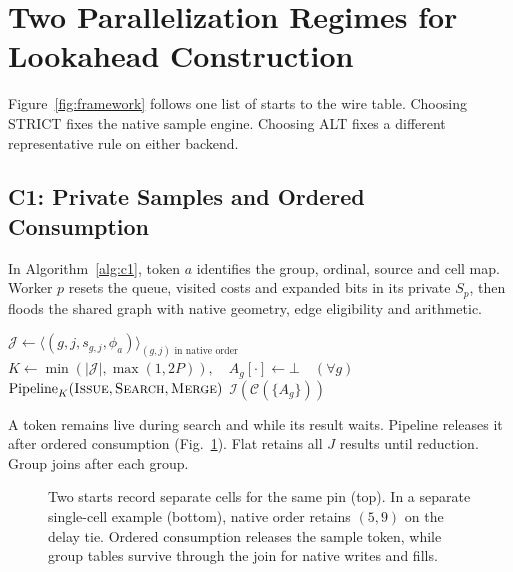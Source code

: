 \section{Two Parallelization Regimes for Lookahead Construction}

Figure~\ref{fig:framework} follows one list of starts to the wire table. Choosing STRICT fixes the native sample engine. Choosing ALT fixes a different representative rule on either backend.
\subsection{C1: Private Samples and Ordered Consumption}
In Algorithm~\ref{alg:c1}, token $a$ identifies the group, ordinal, source and cell map. Worker $p$ resets the queue, visited costs and expanded bits in its private $S_p$, then floods the shared graph with native geometry, edge eligibility and arithmetic.

\begin{algorithm}[t]\footnotesize
\caption{Bounded STRICT sample pipeline (C1)}\label{alg:c1}
$\mathcal J\gets\langle(g,j,s_{g,j},\phi_a)\rangle_{(g,j)\text{ in native order}}$\;
$K\gets\min(|\mathcal J|,\max(1,2P)),\quad A_g[\cdot]\gets\bot\quad(\forall g)$\;
$\operatorname{Pipeline}_K(\textsc{Issue},\textsc{Search},\textsc{Merge})$\;
\Return $\mathcal I(\mathcal C(\{A_g\}))$\;
\end{algorithm}

A token remains live during search and while its result waits. Pipeline releases it after ordered consumption (Fig.~\ref{fig:strict_semantics}). Flat retains all $J$ results until reduction. Group joins after each group.

\begin{figure}[t]
\centering
{\footnotesize}
\caption{Two starts record separate cells for the same pin (top). In a separate single-cell example (bottom), native order retains $(5,9)$ on the delay tie. Ordered consumption releases the sample token, while group tables survive through the join for native writes and fills.}\label{fig:strict_semantics}
\end{figure}

